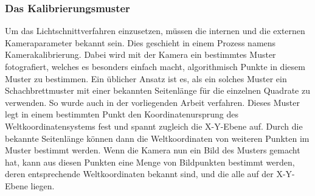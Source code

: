 \subsubsection{Das Kalibrierungsmuster}
Um das Lichtschnittverfahren einzusetzen, müssen die internen und die externen Kameraparameter bekannt sein. Dies geschieht in einem Prozess namens Kamerakalibrierung. Dabei wird mit der Kamera ein bestimmtes Muster fotografiert, welches es besonders einfach macht, algorithmisch Punkte in diesem Muster zu bestimmen. Ein üblicher Ansatz ist es, als ein solches Muster ein Schachbrettmuster mit einer bekannten Seitenlänge für die einzelnen Quadrate zu verwenden. So wurde auch in der vorliegenden Arbeit verfahren. Dieses Muster legt in einem bestimmten Punkt den Koordinatenursprung des Weltkoordinatensystems fest und spannt zugleich die X-Y-Ebene auf. Durch die bekannte Seitenlänge können dann die Weltkoordinaten von weiteren Punkten im Muster bestimmt werden. Wenn die Kamera nun ein Bild des Musters gemacht hat, kann aus diesen Punkten eine Menge von Bildpunkten bestimmt werden, deren entsprechende Weltkoordinaten bekannt sind, und die alle auf der X-Y-Ebene liegen. 

